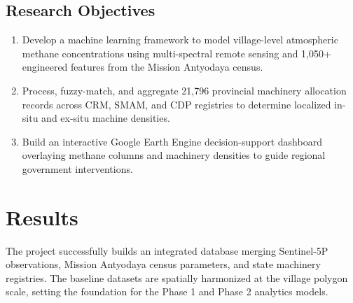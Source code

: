 \documentclass[12pt,a4paper]{report}
\begin{document}
\subsection{Research Objectives}
\begin{enumerate}
    \item Develop a machine learning framework to model village-level atmospheric methane concentrations using multi-spectral remote sensing and 1,050+ engineered features from the Mission Antyodaya census.
    \item Process, fuzzy-match, and aggregate 21,796 provincial machinery allocation records across CRM, SMAM, and CDP registries to determine localized in-situ and ex-situ machine densities.
    \item Build an interactive Google Earth Engine decision-support dashboard overlaying methane columns and machinery densities to guide regional government interventions.
\end{enumerate}

\section{Results}
The project successfully builds an integrated database merging Sentinel-5P observations, Mission Antyodaya census parameters, and state machinery registries. The baseline datasets are spatially harmonized at the village polygon scale, setting the foundation for the Phase 1 and Phase 2 analytics models.
\end{document}
